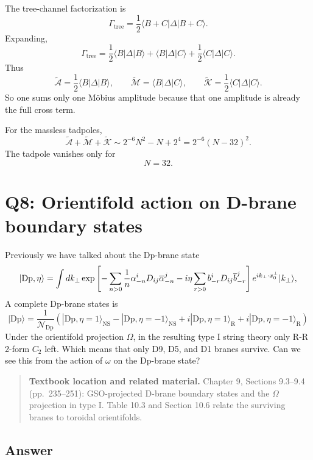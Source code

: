\documentclass[
  10pt,
  a4paper,
  openany]{book}
\begin{document}
The tree-channel factorization is \[
\Gamma_{\mathrm{tree}}
=
\frac{1}{2}
\langle B+C|\Delta|B+C\rangle.
\] Expanding, \[
\Gamma_{\mathrm{tree}}
=
\frac{1}{2}\langle B|\Delta|B\rangle
+
\langle B|\Delta|C\rangle
+
\frac{1}{2}\langle C|\Delta|C\rangle.
\] Thus \[
\tilde{\mathcal A}
=
\frac{1}{2}\langle B|\Delta|B\rangle,
\qquad
\tilde{\mathcal M}
=
\langle B|\Delta|C\rangle,
\qquad
\tilde{\mathcal K}
=
\frac{1}{2}\langle C|\Delta|C\rangle.
\] So one sums only one Möbius amplitude because that one amplitude is
already the full cross term.

For the massless tadpoles, \[
\tilde{\mathcal A}+\tilde{\mathcal M}+\tilde{\mathcal K}
\sim
2^{-6}N^2-N+2^4
=
2^{-6}(N-32)^2.
\] The tadpole vanishes only for \[
\boxed{
N=32.
}
\]

\section{Q8: Orientifold action on D-brane boundary
states}\label{q8-orientifold-action-on-d-brane-boundary-states}

Previously we have talked about the Dp-brane state \[
|{\rm Dp},\eta\rangle=\int d k_{\perp} \exp \left[-\sum_{n>0}\frac{1}{n} \alpha^{i}_{-n} D_{ij} \overline{\alpha}^{j}_{-n} -i \eta\sum_{r>0}b^{ i}_{-r} D_{ij} \overline{b}^{j}_{-r} \right] e^{i k_{\perp}\cdot x_{0}^{ \perp}} |k_{\perp}\rangle ,
\] A complete Dp-brane states is \[
|\mathrm{Dp}\rangle=\frac{1}{\mathcal{N}_{\mathrm{Dp}}}(|\mathrm{Dp},\eta=1\rangle_{\mathrm{NS}}-|\mathrm{Dp},\eta=-1\rangle_{\mathrm{NS}}+i|\mathrm{Dp},\eta=1\rangle_{\mathrm{R}}+i|\mathrm{Dp},\eta=-1\rangle_{\mathrm{R}})
\] Under the orientifold projection \(\Omega\), in the resulting type I
string theory only R-R 2-form \(C_{2}\) left. Which means that only D9,
D5, and D1 branes survive. Can we see this from the action of \(\omega\)
on the Dp-brane state?

\begin{quote}
\textbf{Textbook location and related material.} Chapter 9, Sections
9.3--9.4 (pp.~235--251): GSO-projected D-brane boundary states and the
\(\Omega\) projection in type I. Table 10.3 and Section 10.6 relate the
surviving branes to toroidal orientifolds.
\end{quote}

\subsection{Answer}\label{answer-11}
\end{document}
